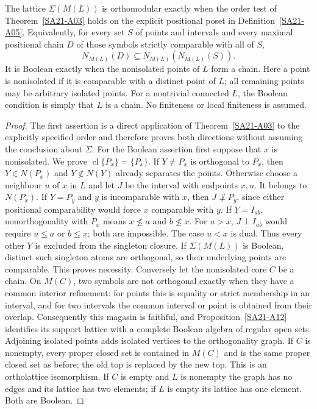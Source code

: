 \begin{theorem}\label{SA21-A06}
The lattice $\Sigma(M(L))$ is orthomodular exactly when the order test
of Theorem~\ref{SA21-A03} holds on the explicit positional poset in
Definition~\ref{SA21-A05}. Equivalently, for every set $S$ of points
and intervals and every maximal positional chain $D$ of those symbols
strictly comparable with all of $S$,
\[
 N_{M(L)}(D)\subseteq N_{M(L)}(N_{M(L)}(S)).
\]
It is Boolean exactly when the nonisolated points of $L$ form a chain.
Here a point is nonisolated if it is comparable with a distinct point
of $L$; all remaining points may be arbitrary isolated points.
For a nontrivial connected $L$, the Boolean condition is simply that
$L$ is a chain. No finiteness or local finiteness is assumed.
\end{theorem}
\begin{proof}
The first assertion is a direct application of Theorem~\ref{SA21-A03}
to the explicitly specified order and therefore proves both directions
without assuming the conclusion about $\Sigma$.
For the Boolean assertion first suppose that $x$ is nonisolated.
We prove $\operatorname{cl}\{P_x\}=\{P_x\}$. If $Y\ne P_x$ is
orthogonal to $P_x$, then $Y\in N(P_x)$ and $Y\notin N(Y)$ already
separates the points. Otherwise choose a neighbour $u$ of $x$ in $L$
and let $J$ be the interval with endpoints $x,u$. It belongs to
$N(P_x)$. If $Y=P_y$ and $y$ is incomparable with $x$, then
$J\not\perp P_y$, since either positional comparability would force
$x$ comparable with $y$. If $Y=I_{ab}$, nonorthogonality with $P_x$
means $x\not\leq a$ and $b\not\leq x$.
For $u>x$, $J\perp I_{ab}$ would require $u\leq a$ or $b\leq x$;
both are impossible. The case $u<x$ is dual. Thus every other $Y$ is
excluded from the singleton closure.
If $\Sigma(M(L))$ is Boolean, distinct such singleton atoms are
orthogonal, so their underlying points are comparable. This proves
necessity.
Conversely let the nonisolated core $C$ be a chain. On $M(C)$,
two symbols are not orthogonal exactly when they have a common
interior refinement: for points this is equality or strict membership
in an interval, and for two intervals the common interval or point is
obtained from their overlap. Consequently this magasin is faithful,
and Proposition~\ref{SA21-A12} identifies its support lattice with a
complete Boolean algebra of regular open sets. Adjoining isolated
points adds isolated vertices to the orthogonality graph. If $C$ is
nonempty, every proper closed set is contained in $M(C)$ and is the
same proper closed set as before; the old top is replaced by the new
top. This is an ortholattice isomorphism. If $C$ is empty and $L$ is
nonempty the graph has no edges and its lattice has two elements;
if $L$ is empty its lattice has one element. Both are Boolean.
\end{proof}

